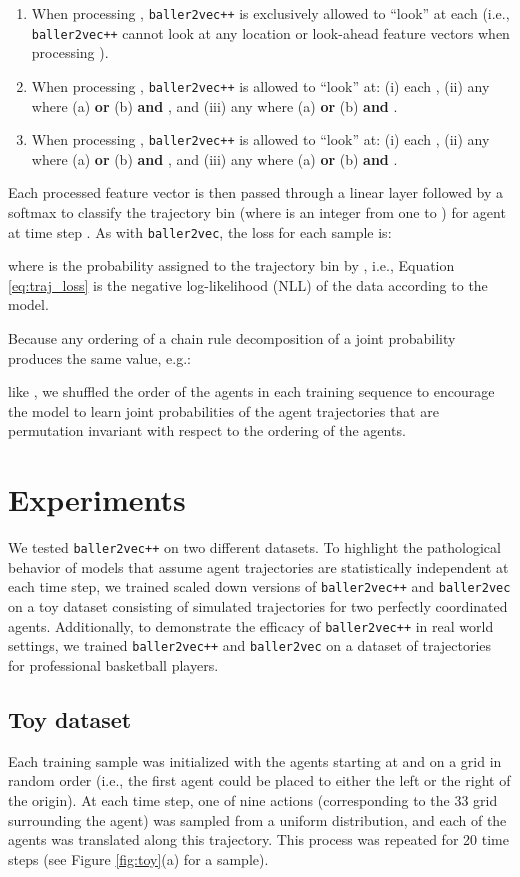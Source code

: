 \documentclass{article}
\newcommand{\btv}{\texttt{baller2vec}}
\newcommand{\btvpp}{\texttt{baller2vec++}}
\begin{document}
\begin{enumerate}
    \item When processing , \btvpp{} is exclusively allowed to ``look'' at each  (i.e., \btvpp{} cannot look at any location or look-ahead feature vectors when processing ).
    \item When processing , \btvpp{} is allowed to ``look'' at: (i) each , (ii) any  where (a)  \textbf{or} (b)  \textbf{and} , and (iii) any  where (a)  \textbf{or} (b)  \textbf{and} .
    \item When processing , \btvpp{} is allowed to ``look'' at: (i) each , (ii) any  where (a)  \textbf{or} (b)  \textbf{and} , and (iii) any  where (a)  \textbf{or} (b)  \textbf{and} .
\end{enumerate}

Each processed  feature vector is then passed through a linear layer followed by a softmax to classify the trajectory bin  (where  is an integer from one to ) for agent  at time step .
As with \btv{}, the loss for each sample is:



\noindent
where  is the probability assigned to the trajectory bin  by , i.e., Equation \eqref{eq:traj_loss} is the negative log-likelihood (NLL) of the data according to the model.

Because any ordering of a chain rule decomposition of a joint probability produces the same value, e.g.:



like \cite{yang2019xlnet}, we shuffled the order of the agents in each training sequence to encourage the model to learn joint probabilities of the agent trajectories that are permutation invariant with respect to the ordering of the agents. 
\section{Experiments}
We tested \btvpp{} on two different datasets.
To highlight the pathological behavior of models that assume agent trajectories are statistically independent at each time step, we trained scaled down versions of \btvpp{} and \btv{} on a toy dataset consisting of simulated trajectories for two perfectly coordinated agents.
Additionally, to demonstrate the efficacy of \btvpp{} in real world settings, we trained \btvpp{} and \btv{} on a dataset of trajectories for professional basketball players.

\subsection{Toy dataset}
Each training sample was initialized with the agents starting at  and  on a grid in random order (i.e., the first agent could be placed to either the left or the right of the origin).
At each time step, one of nine actions (corresponding to the 33 grid surrounding the agent) was sampled from a uniform distribution, and each of the agents was translated along this trajectory.
This process was repeated for 20 time steps (see Figure \ref{fig:toy}(a) for a sample).
\end{document}
